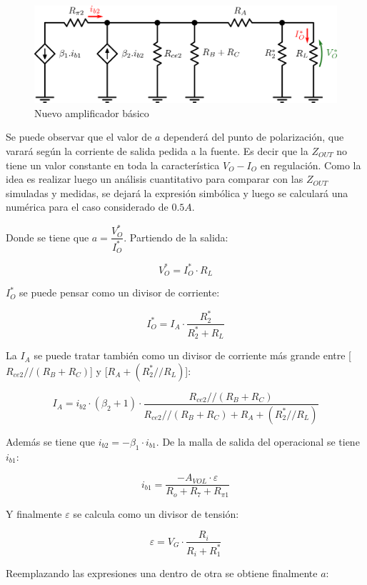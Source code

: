 \begin{figure}[!ht]
\begin{centering}
\includegraphics[scale=0.5]{Imagenes/NuevoAmpBasicoCancer_Parte2.png}
\par\end{centering}
\caption{Nuevo amplificador b\'asico}

\end{figure}

Se puede observar que el valor de $a$ depender\'a del punto de polarizaci\'on, que varar\'a seg\'un la corriente de salida pedida a la fuente. Es decir que la $Z_{OUT}$ no tiene un valor constante en toda la caracter\'istica $V_O - I_O$ en regulaci\'on. Como la idea es realizar luego un an\'alisis cuantitativo para comparar con las $Z_{OUT}$ simuladas y medidas, se dejar\'a la expresi\'on simb\'olica y luego se calcular\'a una num\'erica para el caso considerado de $0.5A$.

Donde se tiene que $a = \dfrac{V^*_O}{I^*_O}$. Partiendo de la salida:

\[
V^*_O = I^*_O \cdot R_L
\]

$I^*_O$ se puede pensar como un divisor de corriente:

\[
I^*_O = I_A \cdot \frac{R^*_2}{R^*_2 + R_L} 
\]

La $I_A$ se puede tratar tambi\'en como un divisor de corriente m\'as grande entre [$R_{ce2}//(R_B+R_C)$] y [$R_A + (R^*_2 // R_L)$]:

\[
I_A = i_{b2} \cdot (\beta_2+1) \cdot \frac{R_{ce2}//(R_B+R_C)}{R_{ce2}//(R_B+R_C) + R_A + (R^*_2 // R_L)}
\]

Adem\'as se tiene que $i_{b2} = -\beta_1 \cdot i_{b1}$. De la malla de salida del operacional se tiene $i_{b1}$:

\[
i_{b1} = \frac{-A_{VOL} \cdot \varepsilon}{R_o + R_7 + R_{\pi1}}
\]

Y finalmente $\varepsilon$ se calcula como un divisor de tensi\'on:

\[
\varepsilon = V_G \cdot \frac{R_i}{R_i + R^*_1}
\]

Reemplazando las expresiones una dentro de otra se obtiene finalmente $a$:


